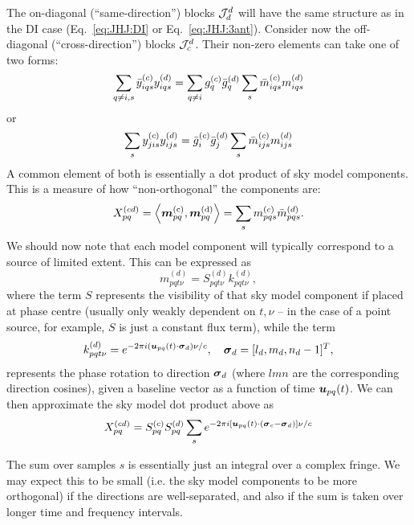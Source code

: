 \documentclass[useAMS,usenatbib]{mn2e}
\numberwithin{equation}{section}
\begin{document}
The on-diagonal (``same-direction'') blocks $\mathcal{J}^d_d$ will have the same structure as in the DI 
case (Eq.~\ref{eq:JHJ:DI} or Eq.~\ref{eq:JHJ:3ant}). Consider now the off-diagonal (``cross-direction'') 
blocks $\mathcal{J}^d_c$. Their non-zero elements can take one of two forms:
\begin{equation}
  \sum\limits_{q\ne i,s} \bar{y}^{(c)}_{iqs} y^{(d)}_{iqs} = \sum\limits_{q\ne i} g^{(c)}_q \bar{g}^{(d)}_q \sum_s \bar{m}^{(c)}_{iqs} m^{(d)}_{iqs}
\end{equation}
or
\begin{equation}
  \sum\limits_{s} y^{(c)}_{jis} y^{(d)}_{ijs} = \bar{g}^{(c)}_i \bar{g}^{(d)}_j \sum_s \bar{m}^{(c)}_{ijs} m^{(d)}_{ijs}
\label{eq:JHJ:DD:crossterms}
\end{equation}
A common element of both is essentially a dot product of sky model components. This is a 
measure of how ``non-orthogonal'' the components are:
\begin{equation}
\label{eq:Xpqcd}
X_{pq}^{(cd)} = \left \langle \bmath{m}_{pq}^\mathrm{(c)},\bmath{m}^\mathrm{(d)}_{pq} \right \rangle = \sum_s \mmc_{pqs} \mmdH_{pqs}.
\end{equation}
We should now note that each model component will typically correspond to a source of limited extent. This can be 
expressed as
\begin{equation}
m_{pqt\nu}^{(d)} = S^{(d)}_{pqt\nu} k^{(d)}_{pqt\nu}, 
\end{equation}
where the term $S$ represents the visibility of that sky model component if placed at phase centre (usually 
only weakly dependent on $t,\nu$ -- in the case of a point source, for example, $S$ is just a constant flux term),
while the term
\begin{equation}
k^{(d)}_{pqt\nu} = e^{-2\pi i (\bmath{u}_{pq}(t)\cdot\bmath{\sigma}_d)\nu/c},~~~\bmath{\sigma}_d = [l_d,m_d,n_d-1]^T,
\end{equation}
represents the phase rotation to direction $\bmath{\sigma}_d$ (where $lmn$ are the corresponding direction cosines), 
given a baseline vector as a function of time $\bmath{u}_{pq}(t)$. We can then approximate the sky model dot product above as
\begin{equation}
X_{pq}^{(cd)} = S^{(c)}_{pq}S^{(d)}_{pq} \sum_s e^{-2\pi i [\bmath{u}_{pq}(t)\cdot(\bmath{\sigma}_c-\bmath{\sigma}_d) ]\nu/c}
\end{equation}

The sum over samples $s$ is essentially just an integral over a complex fringe. We may expect this to be small (i.e. the
sky model components to be more orthogonal) if the directions are well-separated, and also if the sum is taken 
over longer time and frequency intervals. 
\end{document}
